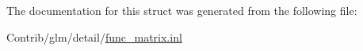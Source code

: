 The documentation for this struct was generated from the following file\+:\begin{DoxyCompactItemize}
\item 
Contrib/glm/detail/\mbox{\hyperlink{func__matrix_8inl}{func\+\_\+matrix.\+inl}}\end{DoxyCompactItemize}
